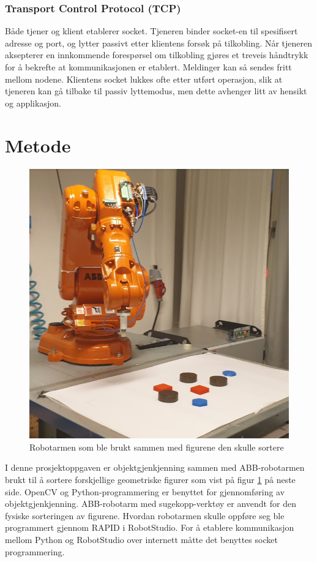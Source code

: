 \documentclass[conference]{IEEEtran}
\begin{document}
        \subsubsection{Transport Control Protocol (TCP)}
            Både tjener og klient etablerer socket. Tjeneren binder socket-en til spesifisert adresse og port, og lytter passivt etter klientens forsøk på tilkobling. Når tjeneren aksepterer en innkommende forespørsel om tilkobling gjøres et treveis håndtrykk for å bekrefte at kommunikasjonen er etablert. 
            Meldinger kan så sendes fritt mellom nodene. Klientens socket lukkes ofte etter utført operasjon, slik at tjeneren kan gå tilbake til passiv lyttemodus, men dette avhenger litt av hensikt og applikasjon.
    
\section{Metode}
    \begin{figure}
        \centering
        \includegraphics[width=.8\linewidth]{images/robotarm.png}
        \caption{Robotarmen som ble brukt sammen med figurene den skulle sortere}
        \label{fig:metode}
    \end{figure}

    I denne prosjektoppgaven er objektgjenkjenning sammen med ABB-robotarmen brukt til å sortere forskjellige geometriske figurer som vist på figur \ref{fig:metode} på neste side. OpenCV og  Python-programmering er benyttet for gjennomføring av objektgjenkjenning. ABB-robotarm med sugekopp-verktøy er anvendt for den fysiske sorteringen av figurene. Hvordan robotarmen skulle oppføre seg ble programmert gjennom RAPID i RobotStudio. For å etablere kommunikasjon mellom Python og RobotStudio over internett måtte det benyttes socket programmering.
\end{document}
